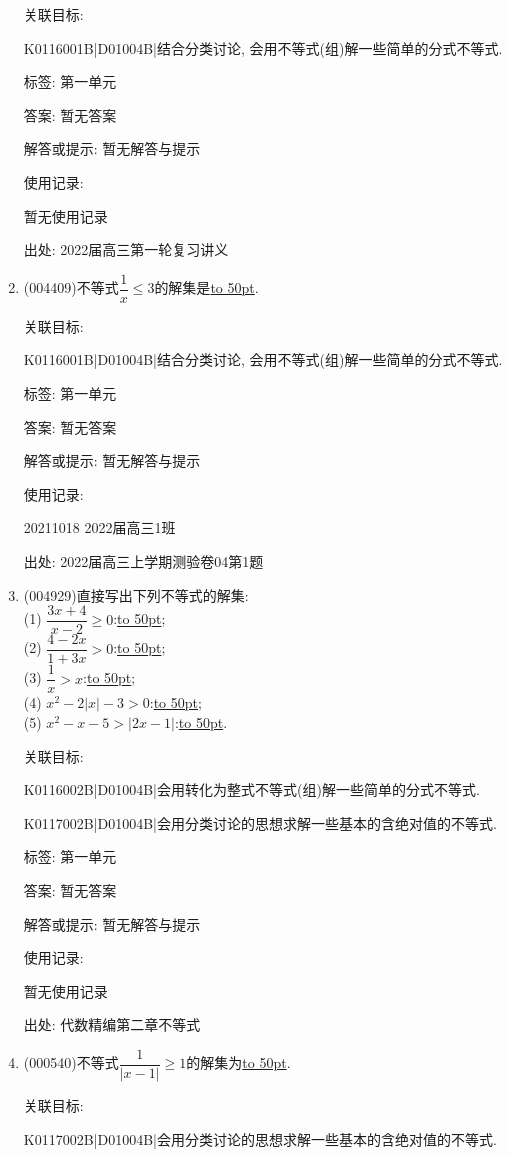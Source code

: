 \documentclass[10pt,a4paper]{article}
\newcommand{\blank}[1]{\underline{\hbox to #1pt{}}}
\begin{document}
\begin{enumerate}[1.]
关联目标:

K0116001B|D01004B|结合分类讨论, 会用不等式(组)解一些简单的分式不等式.



标签: 第一单元

答案: 暂无答案

解答或提示: 暂无解答与提示

使用记录:

暂无使用记录


出处: 2022届高三第一轮复习讲义
\item { (004409)}不等式$\dfrac 1x\le 3$的解集是\blank{50}.


关联目标:

K0116001B|D01004B|结合分类讨论, 会用不等式(组)解一些简单的分式不等式.



标签: 第一单元

答案: 暂无答案

解答或提示: 暂无解答与提示

使用记录:

20211018	2022届高三1班	


出处: 2022届高三上学期测验卷04第1题
\item { (004929)}直接写出下列不等式的解集:\\
(1) $\dfrac{3x+4}{x-2}\ge 0$:\blank{50};\\
(2) $\dfrac{4-2x}{1+3x}>0$:\blank{50};\\
(3) $\dfrac 1x>x$:\blank{50};\\	
(4) $x^2-2|x|-3>0$:\blank{50};\\
(5) $x^2-x-5>|2x-1|$:\blank{50}.


关联目标:

K0116002B|D01004B|会用转化为整式不等式(组)解一些简单的分式不等式.

K0117002B|D01004B|会用分类讨论的思想求解一些基本的含绝对值的不等式.



标签: 第一单元

答案: 暂无答案

解答或提示: 暂无解答与提示

使用记录:

暂无使用记录


出处: 代数精编第二章不等式
\item { (000540)}不等式$\dfrac1{|x-1|}\ge 1 $的解集为\blank{50}.


关联目标:

K0117002B|D01004B|会用分类讨论的思想求解一些基本的含绝对值的不等式.


\end{enumerate}
\end{document}
